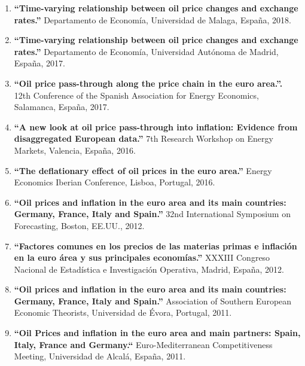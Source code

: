 \documentclass[11pt]{article}\usepackage[]{graphicx}\usepackage[]{color}
\begin{document}
\begin{enumerate}

\item \textbf{``Time-varying relationship between oil price changes and exchange rates.''} Departamento de Economía, Universidad de Malaga, España, 2018.

\item \textbf{``Time-varying relationship between oil price changes and exchange rates.''} Departamento de Economía, Universidad Autónoma de Madrid, España, 2017.

\item \textbf{``Oil price pass-through along the price chain in the euro area.''.} 12th Conference of the Spanish Association for Energy Economics, Salamanca, España, 2017.

\item \textbf{``A new look at oil price pass-through into inflation: Evidence from disaggregated European data.''} 7th Research Workshop on Energy Markets, Valencia, España, 2016.

\item \textbf{``The deflationary effect of oil prices in the euro area.''} Energy Economics Iberian Conference, Lisboa, Portugal, 2016.

\item \textbf{``Oil prices and inflation in the euro area and its main countries: Germany, France, Italy and Spain.''} 32nd International Symposium on Forecasting, Boston, EE.UU., 2012.

\item \textbf{``Factores comunes en los precios de las materias primas e inflación en la euro área y sus principales economías.''} XXXIII Congreso Nacional de Estadística e Investigación Operativa, Madrid, España, 2012.

\item \textbf{``Oil prices and inflation in the euro area and its main countries: Germany, France, Italy and Spain.''} Association of Southern European Economic Theorists, Universidad de Évora, Portugal, 2011.

\item \textbf{``Oil Prices and inflation in the euro area and main partners: Spain, Italy, France and Germany.``} Euro-Mediterranean Competitiveness Meeting, Universidad de Alcalá, España, 2011.

\end{enumerate}

\end{document}
